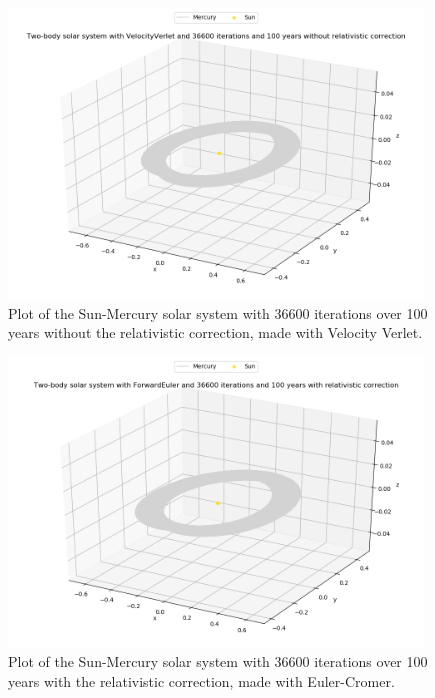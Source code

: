 \documentclass{article}
\begin{document}
    \begin{figure}[H]
        \centering
        \includegraphics[width = 11cm]{img/plot3D_S_M_V_n36600_yr100_newton.png}
        \caption{Plot of the Sun-Mercury solar system with 36600 iterations over 100 years without the relativistic correction, made with Velocity Verlet.}
        \label{fig:plot3D_S_M_V_n36600_yr100_newton}
    \end{figure}

    \begin{figure}[H]
        \centering
        \includegraphics[width = 11cm]{img/plot3D_S_M_F_n36600_yr100.png}
        \caption{Plot of the Sun-Mercury solar system with 36600 iterations over 100 years with the relativistic correction, made with Euler-Cromer.}
        \label{fig:plot3D_S_M_F_n36600_yr100}
    \end{figure}
\end{document}
